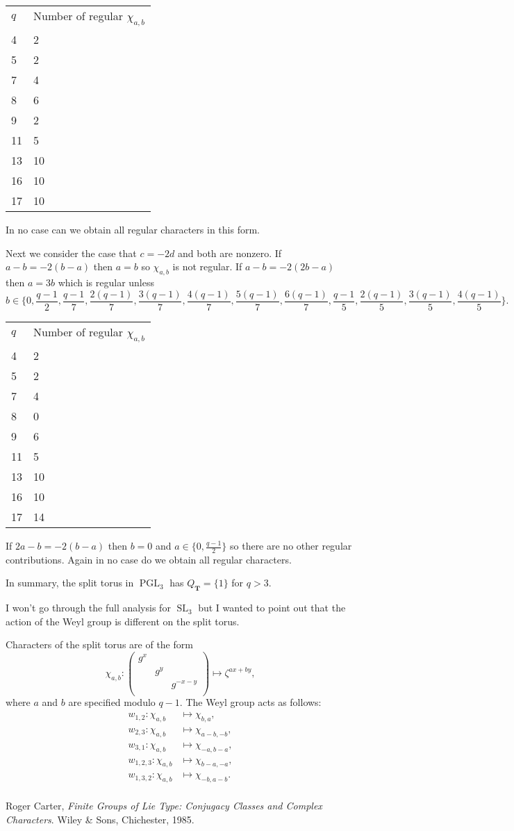 \documentclass[11pt]{amsart}
\theoremstyle{plain}
\theoremstyle{definition}
\DeclareMathOperator{\PGL}{PGL}
\DeclareMathOperator{\SL}{SL}
\newcommand{\T}{\mathbf{T}}
\begin{document}
\begin{tabular}{ll}
$q$ & Number of regular $\chi_{a,b}$ \\
4 & 2 \\
5 & 2 \\
7 & 4 \\
8 & 6 \\
9 & 2 \\
11 & 5 \\
13 & 10 \\
16 & 10 \\
17 & 10
\end{tabular}

In no case can we obtain all regular characters in this form.

Next we consider the case that $c = -2d$ and both are nonzero.  If $a-b = -2(b-a)$ then $a=b$ so $\chi_{a,b}$ is not regular.  If $a-b = -2(2b-a)$ then $a = 3b$ which is regular unless 
$$b \in \{0, \frac{q-1}{2}, \frac{q-1}{7}, \frac{2(q-1)}{7}, \frac{3(q-1)}{7}, \frac{4(q-1)}{7}, \frac{5(q-1)}{7}, \frac{6(q-1)}{7}, \frac{q-1}{5}, \frac{2(q-1)}{5}, \frac{3(q-1)}{5}, \frac{4(q-1)}{5}\}.$$

\begin{tabular}{ll}
$q$ & Number of regular $\chi_{a,b}$ \\
4 & 2 \\
5 & 2 \\
7 & 4 \\
8 & 0 \\
9 & 6 \\
11 & 5 \\
13 & 10 \\
16 & 10 \\
17 & 14
\end{tabular}

If $2a-b = -2(b-a)$ then $b = 0$ and $a \in \{0, \frac{q-1}{2}\}$ so there are no other regular contributions.  Again in no case do we obtain all regular characters.

In summary, the split torus in $\PGL_3$ has $Q_{\T} = \{1\}$ for $q > 3$.

I won't go through the full analysis for $\SL_3$ but I wanted to point out that the action of the Weyl group is different on the split torus.

Characters of the split torus are of the form
$$\chi_{a, b} \colon \begin{pmatrix}
g^x & & \\
& g^y & \\
& & g^{-x-y} \\
\end{pmatrix}
\mapsto \zeta^{ax + by},$$
where $a$ and $b$ are specified modulo $q-1$.  The Weyl group acts as follows:
\begin{align*}
w_{1,2}: \chi_{a,b} &\mapsto \chi_{b, a}, \\
w_{2,3}: \chi_{a,b} &\mapsto \chi_{a-b,-b}, \\
w_{3,1}: \chi_{a,b} &\mapsto \chi_{-a,b-a}, \\
w_{1,2,3}: \chi_{a,b} &\mapsto \chi_{b-a,-a}, \\
w_{1,3,2}: \chi_{a,b} &\mapsto \chi_{-b,a-b}. \\
\end{align*}

\begin{thebibliography}{9}
  Roger Carter,
  \emph{Finite Groups of Lie Type: Conjugacy Classes and Complex Characters}.  Wiley \& Sons, Chichester, 1985.
\end{thebibliography}
\end{document}
